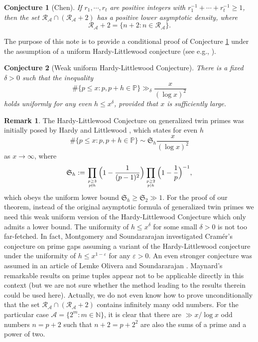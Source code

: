 \documentclass[12pt,a4paper,reqno]{amsart}
\numberwithin{equation}{section}
\theoremstyle{plain}
\newtheorem{conjecture}{Conjecture}
\theoremstyle{definition}
\newtheorem{remark}{Remark}
\begin{document}
\begin{conjecture}[Chen]\label{conjecture-1}
If $r_1,\cdots, r_t$ are positive integers with $r_1^{-1}+\cdots+r_t^{-1}\ge 1$, then
 the set $\mathcal{R}_{\mathcal{A}}\cap(\mathcal{R}_{\mathcal{A}}+2)$ has a positive lower asymptotic density, where
 $$
 \mathcal{R}_{\mathcal{A}}+2=\big\{n+2: n\in\mathcal{R}_{\mathcal{A}}\big\}.
 $$
\end{conjecture}

The purpose of this note is to provide a conditional proof of Conjecture \ref{conjecture-1} under the assumption of a uniform Hardy-Littlewood conjecture (see e.g., \cite{Soundararajan}).

\begin{conjecture}[Weak uniform Hardy-Littlewood Conjecture]\label{conjecture-2}
There is a fixed $\delta>0$ such that the inequality
$$
\#\big\{p\le x: p, p+h\in \mathbb{P}\big\}\gg_\delta \frac{x}{(\log x)^2}
$$
holds uniformly for any even $h\le x^\delta$, provided that $x$ is sufficiently large.
\end{conjecture}

\begin{remark}\label{remark1}
The Hardy-Littlewood Conjecture on generalized twin primes was initially posed by Hardy and Littlewood \cite{Hardy}, which states for even $h$
$$
\#\big\{p\le x: p, p+h\in \mathbb{P}\big\}\sim \mathfrak{S}_h\frac{x}{(\log x)^2}
$$
as $x\to\infty$, where
$$
\mathfrak{S}_h:=\prod_{p\geq 3\atop p\nmid h}\Big(1-\frac{1}{(p-1)^2}\Big)\prod_{p\geq 2\atop p\mid h}\Big(1-\frac{1}{p}\Big)^{-1},
$$
which obeys the uniform lower bound $\mathfrak{S}_h\geq \mathfrak{S}_2\gg 1.$
 For the proof of our theorem, instead of the original asymptotic formula of generalized twin primes we need this weak uniform version of the Hardy-Littlewood Conjecture which only admits a lower bound. The uniformity of $h\le x^\delta$ for some small $\delta>0$ is not too far-fetched. In fact, Montgomery and Soundararajan \cite{Montgomery} investigated Cram\'er's conjecture \cite{Cramer} on prime gaps assuming a variant of the Hardy-Littlewood conjecture under the uniformity of $h\le x^{1-\varepsilon}$ for any $\varepsilon>0$. An even stronger conjecture was assumed in an article of Lemke Olivera and Soundararajan \cite{Soundararajan}. Maynard's remarkable results on prime tuples \cite{Maynard1,Maynard2} appear not to be applicable directly in this context (but we are not sure whether the method leading to the results therein could be used here). Actually, we do not even know how to prove unconditionally that the set $\mathcal{R}_{\mathcal{A}}\cap(\mathcal{R}_{\mathcal{A}}+2)$ contains infinitely many odd numbers. For the particular case $\mathcal{A}=\big\{2^m:m\in \mathbb{N}\big\}$, it is clear that there are $\gg x/\log x$ odd numbers $n=p+2$ such that $n+2=p+2^2$ are also the sums of a prime and a power of two.
\end{remark}
\end{document}
